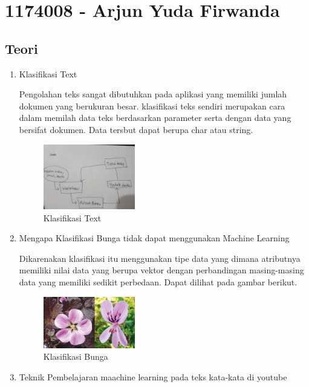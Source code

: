 \section{1174008 - Arjun Yuda Firwanda}
    \subsection{Teori}
    \begin{enumerate}
        \item Klasifikasi Text
        
        Pengolahan teks sangat dibutuhkan pada aplikasi yang memiliki jumlah dokumen yang berukuran besar. klasifikasi teks sendiri merupakan cara dalam memilah data teks berdasarkan parameter serta dengan data yang bersifat dokumen. Data tersbut dapat berupa char atau string.
        \begin{figure}[H]
            \includegraphics[width=4cm]{figures/1174008/4/klasifikasi.jpg}
            \centering
            \caption{Klasifikasi Text}
        \end{figure}

        \item Mengapa Klasifikasi Bunga tidak dapat menggunakan Machine Learning
        
        Dikarenakan klasifikasi itu menggunakan tipe data yang dimana atributnya memiliki nilai data yang berupa vektor dengan perbandingan masing-masing data yang memiliki sedikit perbedaan. Dapat dilihat pada gambar berikut.
        \begin{figure}[H]
            \includegraphics[width=4cm]{figures/1174008/4/bunga.png}
            \centering
            \caption{Klasifikasi Bunga}
        \end{figure}

        \item Teknik Pembelajaran maachine learning pada teks kata-kata di youtube
        

\end{enumerate}
